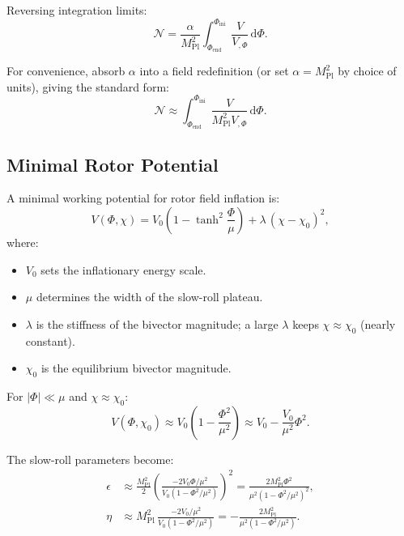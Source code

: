 \documentclass[11pt,a4paper]{article}
\numberwithin{equation}{section}
\theoremstyle{plain}
\theoremstyle{definition}
\theoremstyle{remark}
\newcommand{\dd}{\mathrm{d}}
\begin{document}
Reversing integration limits:
\begin{equation}
\mathcal{N} = \frac{\alpha}{M_{\mathrm{Pl}}^2}\int_{\Phi_{\mathrm{end}}}^{\Phi_{\mathrm{ini}}} \frac{V}{V_{,\Phi}}\,\dd\Phi.
\label{eq:efolds-integral}
\end{equation}

For convenience, absorb $\alpha$ into a field redefinition (or set $\alpha = M_{\mathrm{Pl}}^2$ by choice of units), giving the standard form:
\begin{equation}
\mathcal{N} \approx \int_{\Phi_{\mathrm{end}}}^{\Phi_{\mathrm{ini}}}\frac{V}{M_{\mathrm{Pl}}^2 V_{,\Phi}}\,\dd\Phi.
\label{eq:efolds-standard}
\end{equation}

\subsection{Minimal Rotor Potential}

A minimal working potential for rotor field inflation is:
\begin{equation}
V(\Phi,\chi) = V_0\left(1 - \tanh^2\frac{\Phi}{\mu}\right) + \lambda\,(\chi - \chi_0)^2,
\label{eq:potential}
\end{equation}
where:
\begin{itemize}
  \item $V_0$ sets the inflationary energy scale.
  \item $\mu$ determines the width of the slow-roll plateau.
  \item $\lambda$ is the stiffness of the bivector magnitude; a large $\lambda$ keeps $\chi \approx \chi_0$ (nearly constant).
  \item $\chi_0$ is the equilibrium bivector magnitude.
\end{itemize}

For $|\Phi| \ll \mu$ and $\chi \approx \chi_0$:
\begin{equation}
V(\Phi,\chi_0) \approx V_0\left(1 - \frac{\Phi^2}{\mu^2}\right) \approx V_0 - \frac{V_0}{\mu^2}\Phi^2.
\end{equation}

The slow-roll parameters become:
\begin{align}
\epsilon &\approx \frac{M_{\mathrm{Pl}}^2}{2}\left(\frac{-2V_0\Phi/\mu^2}{V_0(1-\Phi^2/\mu^2)}\right)^2 = \frac{2M_{\mathrm{Pl}}^2\Phi^2}{\mu^2(1-\Phi^2/\mu^2)^2},\\
\eta &\approx M_{\mathrm{Pl}}^2\,\frac{-2V_0/\mu^2}{V_0(1-\Phi^2/\mu^2)} = -\frac{2M_{\mathrm{Pl}}^2}{\mu^2(1-\Phi^2/\mu^2)}.
\end{align}
\end{document}
